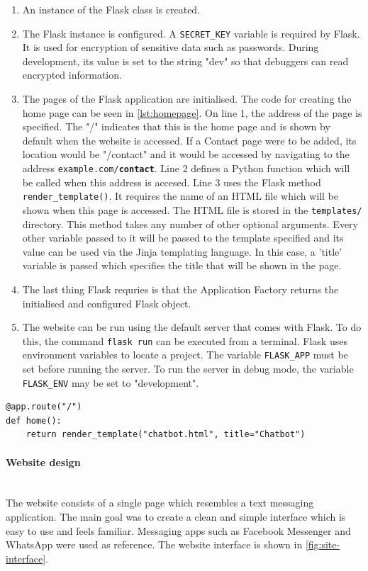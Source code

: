 \documentclass[12pt,a4paper]{article}
\newcommand{\myparagraph}[1]{\paragraph{#1}\mbox{}\\}
\newcommand{\captionstyle}[1] {
    \small{#1}
}
\begin{document}
\begin{enumerate}
    \item An instance of the Flask class is created.
    \item The Flask instance is configured. A \texttt{SECRET\_KEY} variable is required by Flask. It is used for encryption of sensitive data such as passwords. During development, its value is set to the string "dev" so that debuggers can read encrypted information.
    \item The pages of the Flask application are initialised. The code for creating the home page can be seen in \cref{lst:homepage}. On line 1, the address of the page is specified. The "/" indicates that this is the home page and is shown by default when the website is accessed. If a Contact page were to be added, its location would be "/contact" and it would be accessed by navigating to the address \texttt{example.com/\textbf{contact}}. Line 2 defines a Python function which will be called when this address is accesed. Line 3 uses the Flask method \texttt{render\_template()}. It requires the name of an HTML file which will be shown when this page is accessed. The HTML file is stored in the \texttt{templates/} directory. This method takes any number of other optional arguments. Every other variable passed to it will be passed to the template specified and its value can be used via the Jinja templating language. In this case, a 'title' variable is passed which specifies the title that will be shown in the page.
    \item The last thing Flask requries is that the Application Factory returns the initialised and configured Flask object.
    \item The website can be run using the default server that comes with Flask. To do this, the command \texttt{flask run} can be executed from a terminal. Flask uses environment variables to locate a project. The variable \texttt{FLASK\_APP} must be set before running the server. To run the server in debug mode, the variable \texttt{FLASK\_ENV} may be set to "development". 
\end{enumerate}

\begin{lstlisting}[caption={\captionstyle{Initialisation of the home page of the Flask application.}}, label={lst:homepage}]
@app.route("/")
def home():
    return render_template("chatbot.html", title="Chatbot")
\end{lstlisting}

\myparagraph{Website design}
The website consists of a single page which resembles a text messaging application. The main goal was to create a clean and simple interface which is easy to use and feels familiar. Messaging apps such as Facebook Messenger and WhatsApp were used as reference. The website interface is shown in \cref{fig:site-interface}.
\end{document}
